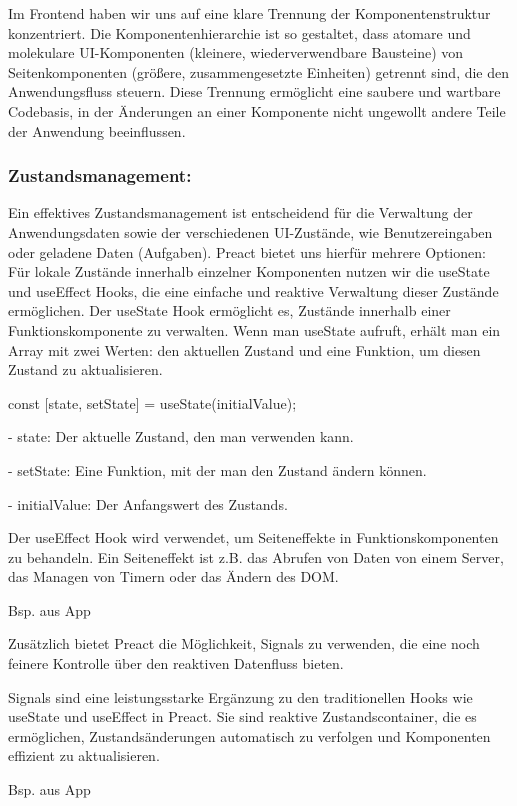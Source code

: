 \documentclass[12pt,a4paper]{article} %
\begin{document}
Im Frontend haben wir uns auf eine klare Trennung der Komponentenstruktur konzentriert. Die Komponentenhierarchie ist so gestaltet, dass atomare und molekulare UI-Komponenten (kleinere, wiederverwendbare Bausteine) von Seitenkomponenten (größere, zusammengesetzte Einheiten) getrennt sind, die den Anwendungsfluss steuern. Diese Trennung ermöglicht eine saubere und wartbare Codebasis, in der Änderungen an einer Komponente nicht ungewollt andere Teile der Anwendung beeinflussen.

\subsubsection{Zustandsmanagement:} 

Ein effektives Zustandsmanagement ist entscheidend für die Verwaltung der Anwendungsdaten sowie der verschiedenen UI-Zustände, wie Benutzereingaben oder geladene Daten (Aufgaben). Preact bietet uns hierfür mehrere Optionen: Für lokale Zustände innerhalb einzelner Komponenten nutzen wir die useState und useEffect Hooks, die eine einfache und reaktive Verwaltung dieser Zustände ermöglichen. 
Der useState Hook ermöglicht es, Zustände innerhalb einer Funktionskomponente zu verwalten. Wenn man useState aufruft, erhält man ein Array mit zwei Werten: den aktuellen Zustand und eine Funktion, um diesen Zustand zu aktualisieren.

const [state, setState] = useState(initialValue);

-	state: Der aktuelle Zustand, den man verwenden kann.

-	setState: Eine Funktion, mit der man den Zustand ändern können.

-	initialValue: Der Anfangswert des Zustands.

Der useEffect Hook wird verwendet, um Seiteneffekte in Funktionskomponenten zu behandeln. Ein Seiteneffekt ist z.B. das Abrufen von Daten von einem Server, das Managen von Timern oder das Ändern des DOM.

Bsp. aus App


Zusätzlich bietet Preact die Möglichkeit, Signals zu verwenden, die eine noch feinere Kontrolle über den reaktiven Datenfluss bieten.

Signals sind eine leistungsstarke Ergänzung zu den traditionellen Hooks wie useState und useEffect in Preact. Sie sind reaktive Zustandscontainer, die es ermöglichen, Zustandsänderungen automatisch zu verfolgen und Komponenten effizient zu aktualisieren.

Bsp. aus App
\end{document}
